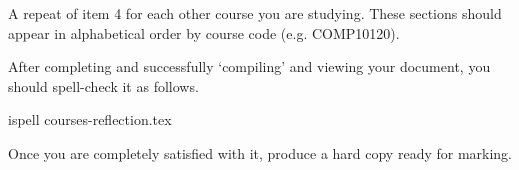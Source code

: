 \begin{refsection}
\begin{enumerate}
\begin{itemize}
  \end{itemize}
 A repeat of item 4 for each other course you are studying. These sections should appear in alphabetical order by course code (e.g. COMP10120).
\end{enumerate} 
After completing and successfully `compiling' and viewing your document, you should spell-check it as follows.

\begin{ttoutenv}
ispell courses-reflection.tex   
\end{ttoutenv}

Once you are completely satisfied with it, produce a hard copy ready for marking.







\end{refsection}
